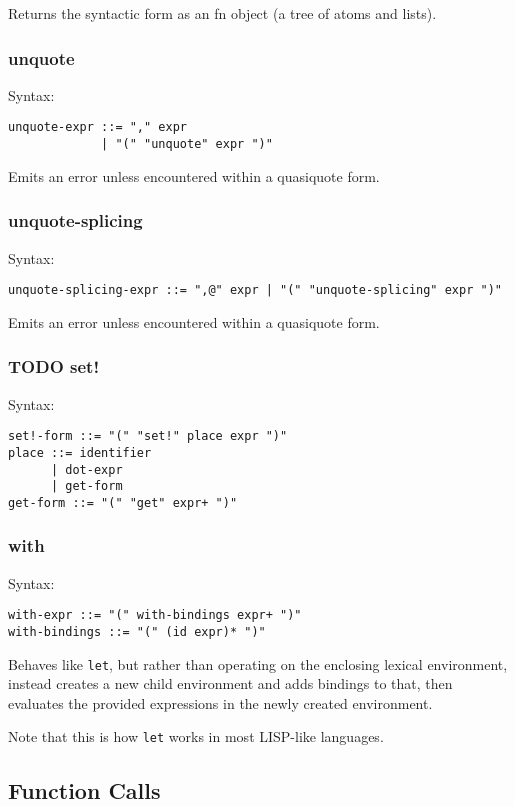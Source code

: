 \documentclass[11pt]{article}
\begin{document}
Returns the syntactic form as an fn object (a tree of atoms and lists).

\subsubsection{unquote}
\label{sec:orgfe08fb0}
Syntax:
\begin{verbatim}
unquote-expr ::= "," expr
             | "(" "unquote" expr ")"
\end{verbatim}
Emits an error unless encountered within a quasiquote form.

\subsubsection{unquote-splicing}
\label{sec:org3e26911}
Syntax:
\begin{verbatim}
unquote-splicing-expr ::= ",@" expr | "(" "unquote-splicing" expr ")"
\end{verbatim}
Emits an error unless encountered within a quasiquote form.

\subsubsection{{\bfseries\sffamily TODO} set!}
\label{sec:orgdce4a8b}
Syntax:
\begin{verbatim}
set!-form ::= "(" "set!" place expr ")"
place ::= identifier 
      | dot-expr
      | get-form
get-form ::= "(" "get" expr+ ")"
\end{verbatim}

\subsubsection{with}
\label{sec:org3b2c38d}
Syntax:
\begin{verbatim}
with-expr ::= "(" with-bindings expr+ ")"
with-bindings ::= "(" (id expr)* ")"
\end{verbatim}

Behaves like \texttt{let}, but rather than operating on the enclosing lexical
environment, instead creates a new child environment and adds bindings to that,
then evaluates the provided expressions in the newly created environment.

Note that this is how \texttt{let} works in most LISP-like languages.


\subsection{Function Calls}
\label{sec:orgb336eed}
\end{document}
